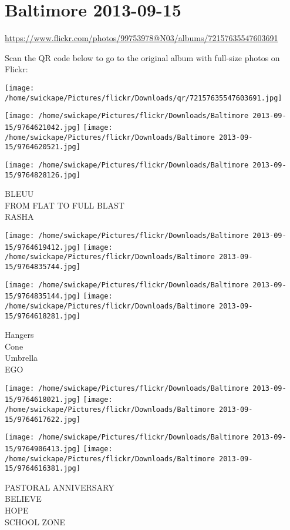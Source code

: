 \documentclass[10pt,letterpaper]{article}
\title{}
\author{}
\date{}
\begin{document}
\section*{Baltimore 2013-09-15}

\url{https://www.flickr.com/photos/99753978@N03/albums/72157635547603691}

Scan the QR code below to go to the original album with full-size photos on Flickr:

\texttt{[image: /home/swickape/Pictures/flickr/Downloads/qr/72157635547603691.jpg]}
\pagebreak

\texttt{[image: /home/swickape/Pictures/flickr/Downloads/Baltimore 2013-09-15/9764621042.jpg]}
\texttt{[image: /home/swickape/Pictures/flickr/Downloads/Baltimore 2013-09-15/9764620521.jpg]}

\vspace{0.25in}
\texttt{[image: /home/swickape/Pictures/flickr/Downloads/Baltimore 2013-09-15/9764828126.jpg]}

BLEUU\\
FROM FLAT TO FULL BLAST\\
RASHA
\pagebreak

\texttt{[image: /home/swickape/Pictures/flickr/Downloads/Baltimore 2013-09-15/9764619412.jpg]}
\texttt{[image: /home/swickape/Pictures/flickr/Downloads/Baltimore 2013-09-15/9764835744.jpg]}

\texttt{[image: /home/swickape/Pictures/flickr/Downloads/Baltimore 2013-09-15/9764835144.jpg]}
\texttt{[image: /home/swickape/Pictures/flickr/Downloads/Baltimore 2013-09-15/9764618281.jpg]}

Hangers\\
Cone\\
Umbrella\\
EGO
\pagebreak

\texttt{[image: /home/swickape/Pictures/flickr/Downloads/Baltimore 2013-09-15/9764618021.jpg]}
\texttt{[image: /home/swickape/Pictures/flickr/Downloads/Baltimore 2013-09-15/9764617622.jpg]}

\texttt{[image: /home/swickape/Pictures/flickr/Downloads/Baltimore 2013-09-15/9764906413.jpg]}
\texttt{[image: /home/swickape/Pictures/flickr/Downloads/Baltimore 2013-09-15/9764616381.jpg]}

PASTORAL ANNIVERSARY\\
BELIEVE\\
HOPE\\
SCHOOL ZONE
\pagebreak
\end{document}
